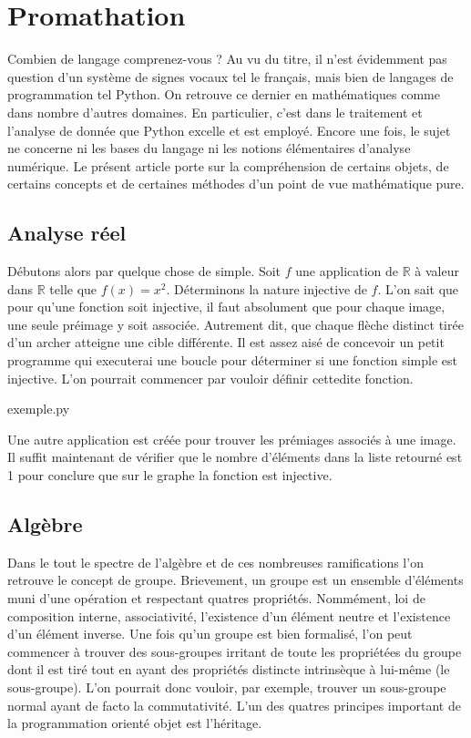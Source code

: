 \documentclass[9pt,french, babel,twocolumn]{extarticle}
\newcommand{\real}{\mathbb{R}}
\begin{document}
	\section*{Promathation}
	Combien de langage comprenez-vous ? Au vu du titre, il n'est évidemment pas question d'un système de signes vocaux tel le français, mais bien de langages de programmation tel Python. On retrouve ce dernier en mathématiques comme dans nombre d'autres domaines. En particulier, c'est dans le traitement et l'analyse de donnée que Python excelle et est employé. Encore une fois, le sujet ne concerne ni les bases du langage ni les notions élémentaires d'analyse numérique. Le présent article porte sur la compréhension de certains objets, de certains concepts et de certaines méthodes d'un point de vue mathématique pure. 
	\subsection*{Analyse réel}
		Débutons alors par quelque chose de simple. Soit \(f\) une application de \(\real\) à valeur dans \(\real\) telle que \(f(x)=x^2\). Déterminons la nature injective de \(f\). L'on sait que pour qu'une fonction soit injective, il faut absolument que pour chaque image, une seule préimage y soit associée. Autrement dit, que chaque flèche distinct tirée d'un archer atteigne une cible différente. Il est assez aisé de concevoir un petit programme qui executerai une boucle pour déterminer si une fonction simple est injective. L'on pourrait commencer par vouloir définir cettedite fonction.
			\begin{Code}\label{code:exemple1}
				
				\caption{exemple.py}
			\end{Code}
		Une autre application est créée pour trouver les prémiages associés à une image. Il suffit maintenant de vérifier que le nombre d'éléments dans la liste retourné est 1 pour conclure que sur le graphe la fonction est injective.
	\subsection*{Algèbre}
		Dans le tout le spectre de l'algèbre et de ces nombreuses ramifications l'on retrouve le concept de groupe. Brievement, un groupe est un ensemble d'éléments muni d'une opération et respectant quatres propriétés. Nommément, loi de composition interne, associativité, l'existence d'un élément neutre et l'existence d'un élément inverse. Une fois qu'un groupe est bien formalisé, l'on peut commencer à trouver des sous-groupes irritant de toute les propriétées du groupe dont il est tiré tout en ayant des propriétés distincte intrinsèque à lui-même (le sous-groupe). L'on pourrait donc vouloir, par exemple, trouver un sous-groupe normal ayant de facto la commutativité. L'un des quatres principes important de la programmation orienté objet est l'héritage.
		
\end{document}
